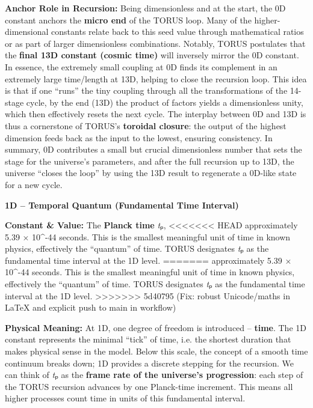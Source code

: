 \documentclass[]{article}
\begin{document}
\textbf{Anchor Role in Recursion:} Being dimensionless and at the start,
the 0D constant anchors the \textbf{micro end} of the TORUS loop. Many
of the higher-dimensional constants relate back to this seed value
through mathematical ratios or as part of larger dimensionless
combinations. Notably, TORUS postulates that the \textbf{final 13D
constant (cosmic time)} will inversely mirror the 0D constant​. In
essence, the extremely small coupling at 0D finds its complement in an
extremely large time/length at 13D, helping to close the recursion loop.
This idea is that if one ``runs'' the tiny coupling through all the
transformations of the 14-stage cycle, by the end (13D) the product of
factors yields a dimensionless unity, which then effectively resets the
next cycle​. The interplay between 0D and 13D is thus a cornerstone of
TORUS's \textbf{toroidal closure}: the output of the highest dimension
feeds back as the input to the lowest, ensuring consistency. In summary,
0D contributes a small but crucial dimensionless number that sets the
stage for the universe's parameters, and after the full recursion up to
13D, the universe ``closes the loop'' by using the 13D result to
regenerate a 0D-like state for a new cycle​.

\textbf{1D -- Temporal Quantum (Fundamental Time Interval)}

\textbf{Constant \& Value:} The \textbf{Planck time} \emph{t}ₚ,
<<<<<<< HEAD
approximately 5.39 × 10\^{}-44 seconds\hspace{0pt}. This is the smallest
meaningful unit of time in known physics, effectively the ``quantum'' of
time. TORUS designates \emph{t}ₚ as the fundamental time interval at the
1D level.
=======
approximately 5.39 × 10\^{}-44 seconds​. This is the smallest meaningful
unit of time in known physics, effectively the ``quantum'' of time.
TORUS designates \emph{t}ₚ as the fundamental time interval at the 1D
level.
>>>>>>> 5d40795 (Fix: robust Unicode/maths in LaTeX and explicit push to main in workflow)

\textbf{Physical Meaning:} At 1D, one degree of freedom is introduced --
\textbf{time}. The 1D constant represents the minimal ``tick'' of time,
i.e. the shortest duration that makes physical sense in the model​.
Below this scale, the concept of a smooth time continuum breaks down; 1D
provides a discrete stepping for the recursion. We can think of
\emph{t}ₚ as the \textbf{frame rate of the universe's progression}​:
each step of the TORUS recursion advances by one Planck-time increment.
This means all higher processes count time in units of this fundamental
interval.
\end{document}
